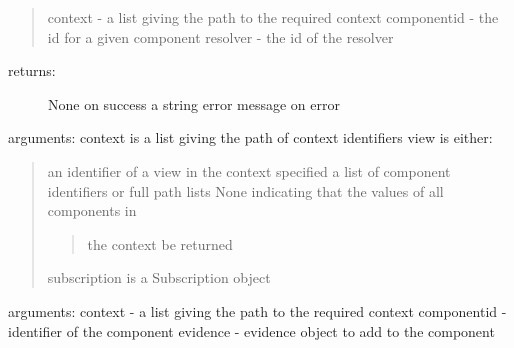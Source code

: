 \documentclass[letterpaper,10pt,english]{sphinxmanual}
\begin{document}
\begin{fulllineitems}
\begin{fulllineitems}
\begin{quote}
context - a list giving the path to the required context
componentid - the id for a given component
resolver - the id of the resolver
\end{quote}
\begin{description}
\item[{returns:}] \leavevmode
None on success
a string error message on error

\end{description}

\end{fulllineitems}


\begin{fulllineitems}
\label{personis.client:personis.client.Access.subscribe}
arguments:
context is a list giving the path of context identifiers
view is either:
\begin{quote}

an identifier of a view in the context specified
a list of component identifiers or full path lists
None indicating that the values of all components in
\begin{quote}

the context be returned
\end{quote}

subscription is a Subscription object
\end{quote}

\end{fulllineitems}


\begin{fulllineitems}
\label{personis.client:personis.client.Access.tell}
arguments:
context - a list giving the path to the required context
componentid - identifier of the component
evidence - evidence object to add to the component

\end{fulllineitems}


\end{fulllineitems}

\end{document}

